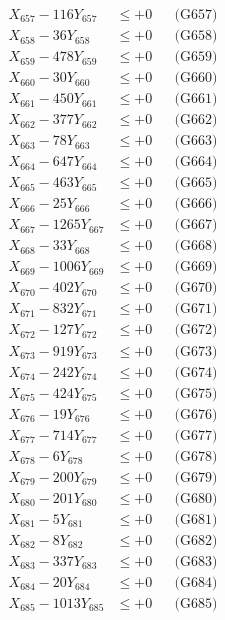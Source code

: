 \documentclass[a4paper,10pt]{article}
\begin{document}
{\begin{align}
X_{657} - 116Y_{657} &\leq +0 && \text{(G657)} \\
X_{658} - 36Y_{658} &\leq +0 && \text{(G658)} \\
X_{659} - 478Y_{659} &\leq +0 && \text{(G659)} \\
X_{660} - 30Y_{660} &\leq +0 && \text{(G660)} \\
\allowbreak
X_{661} - 450Y_{661} &\leq +0 && \text{(G661)} \\
X_{662} - 377Y_{662} &\leq +0 && \text{(G662)} \\
X_{663} - 78Y_{663} &\leq +0 && \text{(G663)} \\
X_{664} - 647Y_{664} &\leq +0 && \text{(G664)} \\
X_{665} - 463Y_{665} &\leq +0 && \text{(G665)} \\
X_{666} - 25Y_{666} &\leq +0 && \text{(G666)} \\
X_{667} - 1265Y_{667} &\leq +0 && \text{(G667)} \\
X_{668} - 33Y_{668} &\leq +0 && \text{(G668)} \\
X_{669} - 1006Y_{669} &\leq +0 && \text{(G669)} \\
X_{670} - 402Y_{670} &\leq +0 && \text{(G670)} \\
\allowbreak
X_{671} - 832Y_{671} &\leq +0 && \text{(G671)} \\
X_{672} - 127Y_{672} &\leq +0 && \text{(G672)} \\
X_{673} - 919Y_{673} &\leq +0 && \text{(G673)} \\
X_{674} - 242Y_{674} &\leq +0 && \text{(G674)} \\
X_{675} - 424Y_{675} &\leq +0 && \text{(G675)} \\
X_{676} - 19Y_{676} &\leq +0 && \text{(G676)} \\
X_{677} - 714Y_{677} &\leq +0 && \text{(G677)} \\
X_{678} - 6Y_{678} &\leq +0 && \text{(G678)} \\
X_{679} - 200Y_{679} &\leq +0 && \text{(G679)} \\
X_{680} - 201Y_{680} &\leq +0 && \text{(G680)} \\
\allowbreak
X_{681} - 5Y_{681} &\leq +0 && \text{(G681)} \\
X_{682} - 8Y_{682} &\leq +0 && \text{(G682)} \\
X_{683} - 337Y_{683} &\leq +0 && \text{(G683)} \\
X_{684} - 20Y_{684} &\leq +0 && \text{(G684)} \\
X_{685} - 1013Y_{685} &\leq +0 && \text{(G685)} \\

\end{align}}
\end{document}
